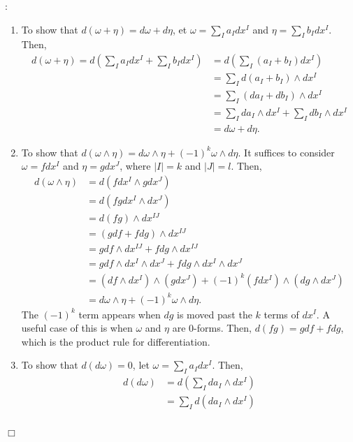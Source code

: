 \documentclass{article}
\theoremstyle{definition}
\theoremstyle{named}
\def\endproofmark{$\Box$}
\newenvironment{proof}{\par\noindent{\bf Proof}:}{\endproofmark\smallskip}
\begin{document}
\begin{proof}
    \begin{enumerate}
        \item To show that $d(\omega + \eta) = d\omega + d\eta$, et $\omega = \sum_{I} a_I dx^I$ and $\eta = \sum_{I} b_I dx^I$. Then,
        \begin{align*}
            d(\omega + \eta) = d\left( \sum_{I} a_I dx^I + \sum_{I} b_I dx^I \right) &= d\left( \sum_{I} (a_I + b_I) dx^I \right) \\
            &= \sum_{I} d(a_I + b_I) \wedge dx^I \\
            &= \sum_{I} (da_I + db_I) \wedge dx^I \\
            &= \sum_{I} da_I \wedge dx^I + \sum_{I} db_I \wedge dx^I \\
            &= d\omega + d\eta.
        \end{align*}
        \item To show that $d(\omega \wedge \eta) = d\omega \wedge \eta + (-1)^k \omega \wedge d\eta$. It suffices to consider $\omega = f dx^I$ and $\eta = g dx^J$, where $|I| = k$ and $|J| = l$. Then,
        \begin{align*}
            d(\omega \wedge \eta) &= d(f dx^I \wedge g dx^J) \\
            &= d(fg dx^I \wedge dx^J) \\
            &= d(fg) \wedge dx^{IJ}\\
            &= (g df + f dg) \wedge dx^{IJ}\\
            &= g df \wedge dx^{IJ} + f dg \wedge dx^{IJ}\\
            &= g df \wedge dx^I \wedge dx^J + f dg \wedge dx^I \wedge dx^J\\
            &= (df\wedge dx^I) \wedge (g dx^J) + (-1)^k (f dx^I) \wedge (dg\wedge dx^J)\\
            &= d\omega \wedge \eta + (-1)^k \omega \wedge d\eta.
        \end{align*}
        The $(-1)^k$ term appears when $dg$ is moved past the $k$ terms of $dx^I$.
        A useful case of this is when $\omega$ and $\eta$ are 0-forms. Then, $d(fg) = g df + f dg$, which is the product rule for differentiation.
        \item To show that $d(d\omega) =  0$, let $\omega = \sum_{I} a_I dx^I$. Then,
        \begin{align*}
            d(d\omega) &= d\left( \sum_{I} da_I \wedge dx^I \right) \\
            &= \sum_{I} d(da_I \wedge dx^I) \\

\end{align*}
\end{enumerate}
\end{proof}
\end{document}
